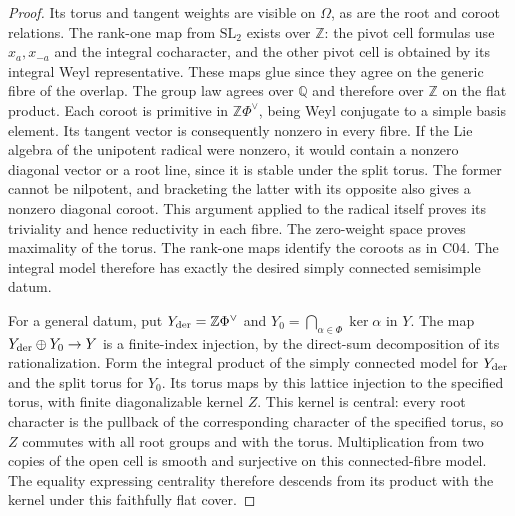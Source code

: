 \documentclass[11pt,a4paper,openany,oneside]{book}
\theoremstyle{resultstyle}
\theoremstyle{definition}
\numberwithin{equation}{chapter}
\newcommand{\SL}{\mathrm{SL}}
\newcommand{\ZZ}{\mathbb{Z}}
\newcommand{\QQ}{\mathbb{Q}}
\begin{document}
\begin{proof}
Its torus and tangent weights are visible on \(\Omega\), as are the root
and coroot relations. The rank-one map from \(\SL_2\) exists over
\(\ZZ\): the pivot cell formulas use \(x_a,x_{-a}\) and the integral
cocharacter, and the other pivot cell is obtained by its integral Weyl
representative. These maps glue since they agree on the generic fibre of
the overlap. The group law agrees over \(\QQ\) and therefore over
\(\ZZ\) on the flat product. Each coroot is primitive in
\(\ZZ\Phi^\vee\), being Weyl conjugate to a simple basis element. Its
tangent vector is consequently nonzero in every fibre. If the Lie
algebra of the unipotent radical were nonzero, it would contain a
nonzero diagonal vector or a root line, since it is stable under the
split torus. The former cannot be nilpotent, and bracketing the latter
with its opposite also gives a nonzero diagonal coroot. This argument
applied to the radical itself proves its triviality and hence
reductivity in each fibre. The zero-weight space proves maximality of
the torus. The rank-one maps identify the coroots as in C04. The
integral model therefore has exactly the desired simply connected
semisimple datum.

For a general datum, put \(Y_{\rm der}=\ZZ\Phi^\vee\) and
\(Y_0=\bigcap_{\alpha\in\Phi}\ker\alpha\) in \(Y\). The map \(Y_{\rm
der}\oplus Y_0\to Y\) is a finite-index injection, by the direct-sum
decomposition of its rationalization. Form the integral product of the
simply connected model for \(Y_{\rm der}\) and the split torus for
\(Y_0\). Its torus maps by this lattice injection to the specified
torus, with finite diagonalizable kernel \(Z\). This kernel is central:
every root character is the pullback of the corresponding character of
the specified torus, so \(Z\) commutes with all root groups and with the
torus. Multiplication from two copies of the open cell is smooth and
surjective on this connected-fibre model. The equality expressing
centrality therefore descends from its product with the kernel under
this faithfully flat cover.


\end{proof}
\end{document}
